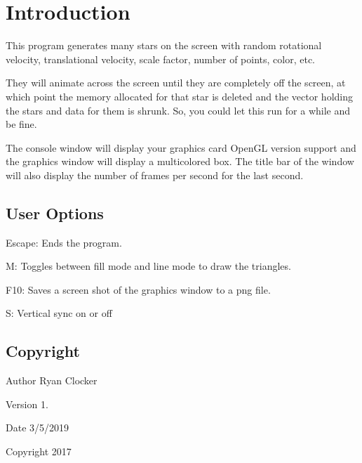 \hypertarget{index_intro}{}\section{Introduction}\label{index_intro}
This program generates many stars on the screen with random rotational velocity, translational velocity, scale factor, number of points, color, etc.

They will animate across the screen until they are completely off the screen, at which point the memory allocated for that star is deleted and the vector holding the stars and data for them is shrunk. So, you could let this run for a while and be fine.

The console window will display your graphics card Open\+GL version support and the graphics window will display a multicolored box. The title bar of the window will also display the number of frames per second for the last second.\hypertarget{index_options}{}\subsection{User Options}\label{index_options}

\begin{DoxyItemize}
\item Escape\+: Ends the program.
\item M\+: Toggles between fill mode and line mode to draw the triangles.
\item F10\+: Saves a screen shot of the graphics window to a png file.
\item S\+: Vertical sync on or off
\end{DoxyItemize}



\hypertarget{index_copyright}{}\subsection{Copyright}\label{index_copyright}
\begin{DoxyAuthor}{Author}
Ryan Clocker 
\end{DoxyAuthor}
\begin{DoxyVersion}{Version}
1. 
\end{DoxyVersion}
\begin{DoxyDate}{Date}
3/5/2019 
\end{DoxyDate}
\begin{DoxyCopyright}{Copyright}
2017
\end{DoxyCopyright}


